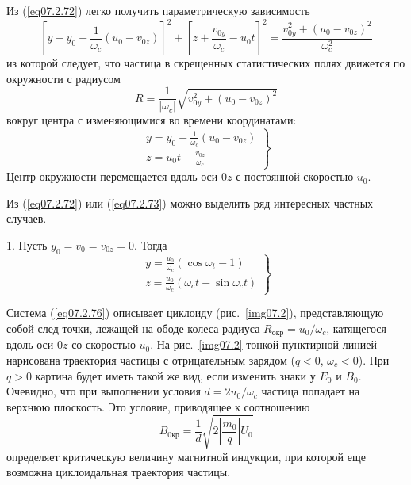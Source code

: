 Из (\ref{eq07.2.72}) легко получить параметрическую зависимость
\begin{equation}
	\left[ y - y_0 + \frac{1}{\omega_c}(u_0 - v_{0z}) \right]^2 + 
		\left[ z + \frac{v_{0y}}{\omega_c} - u_0 t \right]^2 = 
		\frac{v^2_{0y} + (u_0 - v_{0z})^2}{\omega^2_c}
	\label{eq07.2.73}
\end{equation}
из которой следует, что частица в скрещенных статистических полях движется по 
окружности с радиусом
\begin{equation}
	R = \frac{1}{|\omega_c|}\sqrt{v^2_{0y}+(u_0 -v_{0z})^2}
	\label{eq07.2.74}
\end{equation}
вокруг центра с изменяющимися во времени координатами:
\begin{equation}
	\left. \begin{array}{c}
		y = y_0 - \frac{1}{\omega_c}(u_0 - v_{0z}) \\
		z = u_0 t - \frac{v_{0z}}{\omega_c}
	\end{array} \right\}
	\label{eq07.2.75}
\end{equation}
Центр окружности перемещается вдоль оси \( 0z \) с постоянной скоростью 
\( u_0 \).

Из (\ref{eq07.2.72}) или (\ref{eq07.2.73}) можно выделить ряд интересных 
частных случаев. 

1. Пусть \( y_0 = v_0 = v_{0z} = 0 \). Тогда
\begin{equation}
	\left. \begin{array}{c}
		y = \frac{u_0}{\omega_c}(\cos\omega_t - 1) \\
		z = \frac{u_0}{\omega_c}(\omega_c t - \sin\omega_c t)
	\end{array} \right\}
	\label{eq07.2.76}
\end{equation}

Система (\ref{eq07.2.76})  описывает циклоиду  (рис.~\ref{img07.2}), 
представляющую собой след точки, лежащей на ободе колеса радиуса 
\( R_\text{окр} = u_0 / \omega_c \), катящегося вдоль оси \( 0z \) со 
скоростью \( u_0 \). На рис.~\ref{img07.2} тонкой пунктирной линией 
нарисована траектория частицы с отрицательным зарядом (\( q < 0 \), 
\( \omega_c < 0 \)). При \( q > 0 \) картина будет иметь такой же вид, если 
изменить знаки у \( E_0 \) и \( B_0 \). Очевидно, что при выполнении условия 
\( d = 2u_0/\omega_c \) частица попадает на верхнюю плоскость. Это условие, 
приводящее к соотношению
\[
	B_{0\text{кр}} = \frac{1}{d}\sqrt{2\left| \frac{m_0}{q} \right| U_0}
\]
определяет критическую величину магнитной индукции, при которой еще возможна 
циклоидальная траектория частицы.

